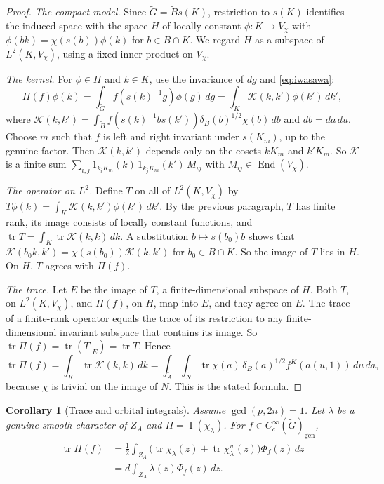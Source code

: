 \documentclass[12pt,letterpaper]{article}
\numberwithin{equation}{section}
\theoremstyle{plain}
\newtheorem{corollary}[theorem]{Corollary}
\theoremstyle{definition}
\theoremstyle{remark}
\newcommand{\Gt}{\widetilde G}
\newcommand{\At}{\widetilde A}
\newcommand{\Bt}{\widetilde B}
\newcommand{\wt}{\tilde w}
\newcommand{\ZA}{Z_A}
\newcommand{\gen}{\mathrm{gen}}
\DeclareMathOperator{\PI}{I}
\DeclareMathOperator{\tr}{tr}
\begin{document}
\begin{proof}
\emph{The compact model.} Since $\Gt=\Bt s(K)$, restriction to $s(K)$
identifies the induced space with the space $H$ of locally constant
$\phi:K\to V_\chi$ with $\phi(bk)=\chi(s(b))\phi(k)$ for $b\in B\cap K$.
We regard $H$ as a subspace of $L^2(K,V_\chi)$, using a fixed inner
product on $V_\chi$.

\emph{The kernel.} For $\phi\in H$ and $k\in K$, use the invariance of
$dg$ and \eqref{eq:iwasawa}:
\[
\Pi(f)\phi(k)=\int_{\Gt}f(s(k)^{-1}g)\phi(g)\,dg
=\int_K\mathcal K(k,k')\phi(k')\,dk',
\]
where $\mathcal K(k,k')=\int_{\Bt}f(s(k)^{-1}bs(k'))\delta_B(b)^{1/2}
\chi(b)\,db$ and $db=da\,du$. Choose $m$ such that $f$ is left and
right invariant under $s(K_m)$, up to the genuine factor. Then
$\mathcal K(k,k')$ depends only on the cosets $kK_m$ and $k'K_m$. So
$\mathcal K$ is a finite sum $\sum_{i,j}1_{k_iK_m}(k)\,
1_{k_jK_m}(k')\,M_{ij}$ with $M_{ij}\in\operatorname{End}(V_\chi)$.

\emph{The operator on $L^2$.} Define $T$ on all of $L^2(K,V_\chi)$ by
$T\phi(k)=\int_K\mathcal K(k,k')\phi(k')\,dk'$. By the previous
paragraph, $T$ has finite rank, its image consists of locally constant
functions, and $\tr T=\int_K\tr\mathcal K(k,k)\,dk$. A substitution
$b\mapsto s(b_0)b$ shows that
$\mathcal K(b_0k,k')=\chi(s(b_0))\mathcal K(k,k')$ for $b_0\in B\cap K$.
So the image of $T$ lies in $H$. On $H$, $T$ agrees with $\Pi(f)$.

\emph{The trace.} Let $E$ be the image of $T$, a finite-dimensional
subspace of $H$. Both $T$, on $L^2(K,V_\chi)$, and $\Pi(f)$, on $H$, map
into $E$, and they agree on $E$. The trace of a finite-rank operator
equals the trace of its restriction to any finite-dimensional invariant
subspace that contains its image. So $\tr\Pi(f)=\tr(T|_E)=\tr T$.
Hence
\[
\tr\Pi(f)=\int_K\tr\mathcal K(k,k)\,dk
=\int_{\At}\int_N\tr\chi(a)\,\delta_B(a)^{1/2}f^K(a(u,1))\,du\,da ,
\]
because $\chi$ is trivial on the image of $N$. This is the stated
formula.
\end{proof}

\begin{corollary}[Trace and orbital integrals]\label{cor:trace-integral}
Assume $\gcd(p,2n)=1$. Let $\lambda$ be a genuine smooth character of
$\ZA$ and $\Pi=\PI(\chi_\lambda)$. For $f\in C_c^\infty(\Gt)_\gen$,
\begin{align}
\tr\Pi(f)&=\frac12\int_{\ZA}\bigl(\tr\chi_\lambda(z)
+\tr\chi_\lambda^{\wt}(z)\bigr)\Phi_f(z)\,dz\label{eq:trace-first}\\
&=d\int_{\ZA}\lambda(z)\Phi_f(z)\,dz .\label{eq:trace-second}
\end{align}
\end{corollary}
\end{document}
